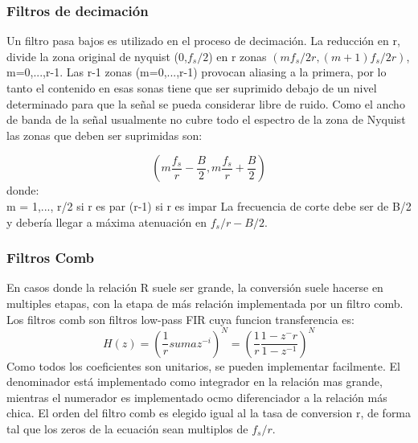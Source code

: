 \documentclass[assd_tp3_main.tex]{subfiles}
\begin{document}
\subsubsection{Filtros de decimación}
Un filtro pasa bajos es utilizado en el proceso de decimación. La reducción en r, divide la zona original de nyquist (0,$f_s/2$) en r zonas $(mf_s/2r,(m+1)f_s/2r)$, m=0,...,r-1. Las r-1 zonas (m=0,...,r-1) provocan aliasing a la primera, por lo tanto el contenido en esas sonas tiene que ser suprimido debajo de un nivel determinado para que la señal se pueda considerar libre de ruido. Como el ancho de banda de la señal usualmente no cubre todo el espectro de la zona de Nyquist las zonas que deben ser suprimidas son:

\[ (m\frac{f_s}{r}-\frac{B}{2},m\frac{f_s}{r}+\frac{B}{2}) \]
donde:\\
m = 1,...,
r/2 si r es par
(r-1) si r es impar 
La frecuencia de corte debe ser de B/2 y debería llegar a máxima atenuación en $f_s/r-B/2$.
\subsubsection{Filtros Comb}
En casos donde la relación R suele ser grande, la conversión suele hacerse en multiples etapas, con la etapa de más relación implementada por un filtro comb.
Los filtros comb son filtros low-pass FIR cuya funcion transferencia es:
\[ H(z)=(\frac{1}{r}suma z^{-i})^N=(\frac{1}{r}\frac{1-z^-{r}}{1-z^{-1}})^N \]
Como todos los coeficientes son unitarios, se pueden implementar facilmente.
El denominador está implementado como integrador en la relación mas grande, mientras el numerador es implementado ocmo diferenciador a la relación más chica. El orden del filtro comb es elegido igual al la tasa de conversion r, de forma tal que los zeros de la ecuación sean multiplos de $f_s/r$.
\end{document}
